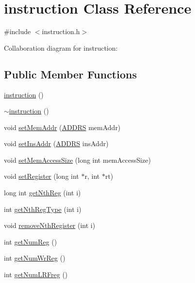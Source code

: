 \hypertarget{classinstruction}{
\section{instruction Class Reference}
\label{classinstruction}
}


{\ttfamily \#include $<$instruction.h$>$}



Collaboration diagram for instruction:
\subsection*{Public Member Functions}
\begin{DoxyCompactItemize}
\item 
\hyperlink{classinstruction_a2e0bfed549166dbfa1ce77ec084ea310}{instruction} ()
\item 
\hyperlink{classinstruction_a4f9c54b6376cf77565179728fa6f68fa}{$\sim$instruction} ()
\item 
void \hyperlink{classinstruction_a69e75dc34c4197b03e33a0032ae03e8f}{setMemAddr} (\hyperlink{global_2global_8h_a7ea74bb9ffd2e4d41550ae2383dd25bc}{ADDRS} memAddr)
\item 
void \hyperlink{classinstruction_ac39145295a94852d0a3efe8c8247473d}{setInsAddr} (\hyperlink{global_2global_8h_a7ea74bb9ffd2e4d41550ae2383dd25bc}{ADDRS} insAddr)
\item 
void \hyperlink{classinstruction_a4e1387f9782160c95597c81694ec0775}{setMemAccessSize} (long int memAccessSize)
\item 
void \hyperlink{classinstruction_a456de8aa26ff79d2b7cd203f7c59f2cb}{setRegister} (long int $\ast$r, int $\ast$rt)
\item 
long int \hyperlink{classinstruction_a54412da0ee022e05101d4fb92ee879b9}{getNthReg} (int i)
\item 
int \hyperlink{classinstruction_a9701f53aafaf1b2298378665059cef33}{getNthRegType} (int i)
\item 
void \hyperlink{classinstruction_aabb46003e886f87cd3bc918f05a3682f}{removeNthRegister} (int i)
\item 
int \hyperlink{classinstruction_af64e1265e882da7e152bd47cb7794c3b}{getNumReg} ()
\item 
int \hyperlink{classinstruction_abe651f9e294dd53e1f515c6856e7e8a3}{getNumWrReg} ()
\item 
int \hyperlink{classinstruction_a71809c767dba335b3bbdad04cb24d43c}{getNumLRFreg} ()
\item 

\end{DoxyCompactItemize}
